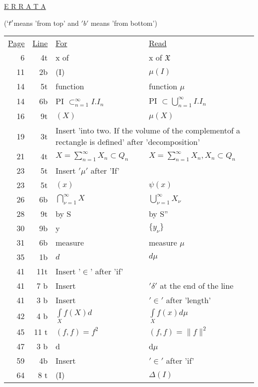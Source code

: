    
 \begin{center}
\underline{E R R A T A}
\end{center}

\begin{center}
($`t'$\pageoriginale means 'from top' and $'b'$ means 'from bottom')

\begin{longtable}{rrll}
  \underline{Page} &  \underline{Line} & \underline {For}  & \underline{Read}\\
  6 & 4t & x of & x of $\mathfrak{X}$ \\
  11 & 2b & (I) & $\mu(I)$\\
  14 & 5t & function & function $\mu$\\
  14 & 6b & PI $\displaystyle{\subset^{\infty}_{n=1}}  I.I_n$ & PI
  $\subset\bigcup\limits^{\infty}_{n=1} I.I_n$\\ 
  16 & 9t & $(X)$ & $\mu (X)$\\
  19 & 3t & \multicolumn{2}{p{7cm}}{Insert 'into two.  If the volume of
    the complementof a rectangle is defined' after 'decomposition'}\\
  21 & 4t & $X = \sum\limits^{\infty}_{n=1} X_n \subset Q_n$
  & $X = \sum\limits^{\infty}_{n=1} X_n, X_n \subset Q_n$\\ 
  23 & 5t & Insert $'\mu'$ after 'If'\\
  23 & 5t & $(x)$ &  $\psi(x) $\\
  26 & 6b & $\bigcap\limits^{\infty}_{\nu = 1}X$ &
  $\bigcup\limits^{\infty}_{\nu = 1} X_\nu$\\ 
  28 & 9t & by S & by S''\\
  30 & 9b & y & $\{y_\nu\}$\\
  31 & 6b & measure & measure $\mu$\\
  35 & 1b & $d$ & $d \mu$\\
  41 & 11t & \multicolumn {2}{l}{Insert '$\in$' after 'if'}\\
  41 & 7 b & Insert &  $'\delta' $ at the end of the line\\
  41 & 3 b & Insert & $' \in '$ after 'length'\\
  42 & 4 b & $\int\limits_X f(X)d$ & $\int\limits_X f(x) d\mu$\\
  45 & 11 t & $(f,f)=f^2$ & $(f,f)=\|f\|^2$\\
  47 & 3 b & d & d$\mu$\\
  59 & 4b & Insert & $'\in'$ after 'if'\\
  64 & 8 t & (I) & $\Delta (I)$\\

\end{longtable}
\end{center}
